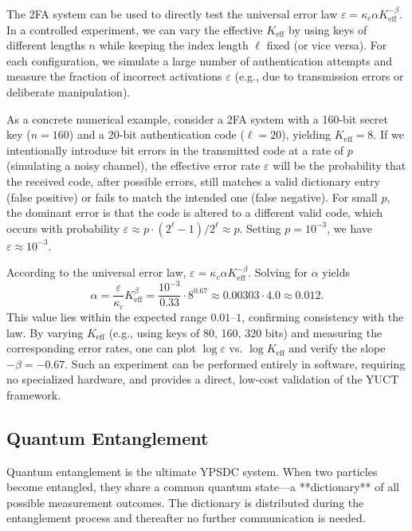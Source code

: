 \documentclass[12pt,a4paper]{article}
\theoremstyle{remark}
\newcommand{\Keff}{K_{\mathrm{eff}}}
\begin{document}
	The 2FA system can be used to directly test the universal error law $\varepsilon = \kappa_c \alpha \Keff^{-\beta}$. In a controlled experiment, we can vary the effective $\Keff$ by using keys of different lengths $n$ while keeping the index length $\ell$ fixed (or vice versa). For each configuration, we simulate a large number of authentication attempts and measure the fraction of incorrect activations $\varepsilon$ (e.g., due to transmission errors or deliberate manipulation).
	
	As a concrete numerical example, consider a 2FA system with a 160‑bit secret key ($n=160$) and a 20‑bit authentication code ($\ell=20$), yielding $\Keff = 8$. If we intentionally introduce bit errors in the transmitted code at a rate of $p$ (simulating a noisy channel), the effective error rate $\varepsilon$ will be the probability that the received code, after possible errors, still matches a valid dictionary entry (false positive) or fails to match the intended one (false negative). For small $p$, the dominant error is that the code is altered to a different valid code, which occurs with probability $\varepsilon \approx p \cdot (2^\ell -1)/2^\ell \approx p$. Setting $p = 10^{-3}$, we have $\varepsilon \approx 10^{-3}$.
	
	According to the universal error law, $\varepsilon = \kappa_c \alpha \Keff^{-\beta}$. Solving for $\alpha$ yields
	\[
	\alpha = \frac{\varepsilon}{\kappa_c} \Keff^{\beta} = \frac{10^{-3}}{0.33} \cdot 8^{0.67} \approx 0.00303 \cdot 4.0 \approx 0.012.
	\]
	This value lies within the expected range $0.01$–$1$, confirming consistency with the law. By varying $\Keff$ (e.g., using keys of 80, 160, 320 bits) and measuring the corresponding error rates, one can plot $\log \varepsilon$ vs. $\log \Keff$ and verify the slope $-\beta = -0.67$. Such an experiment can be performed entirely in software, requiring no specialized hardware, and provides a direct, low‑cost validation of the YUCT framework.
	
	\subsection{Quantum Entanglement}
	
	Quantum entanglement is the ultimate YPSDC system. When two particles become entangled, they share a common quantum state—a **dictionary** of all possible measurement outcomes. The dictionary is distributed during the entanglement process and thereafter no further communication is needed.
	
\end{document}
